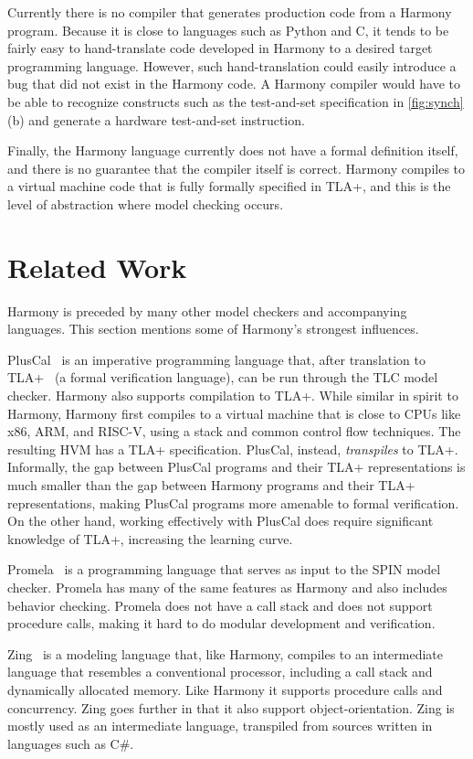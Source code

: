 \documentclass[twocolumn]{article}
\begin{document}
Currently there is no compiler that generates production code from
a Harmony program.
Because it is close to languages such as Python and C, it tends to be fairly
easy to hand-translate code developed in Harmony to a desired target
programming language.  However, such hand-translation could easily
introduce a bug that did not exist in the Harmony code.
A Harmony compiler would have to be able to recognize constructs such as
the test-and-set specification in \autoref{fig:synch}(b) and generate
a hardware test-and-set instruction.

Finally, the Harmony language currently does not have a formal definition
itself, and there is no guarantee that the compiler itself is correct.
Harmony compiles to a virtual machine code that is fully formally
specified in TLA+, and this is the level of abstraction where model
checking occurs.

\section{Related Work}

Harmony is preceded by many other model checkers and accompanying
languages.  This section mentions some of Harmony's strongest influences.

PlusCal~\cite{Lamport09} is an imperative programming language that,
after translation to TLA+~\cite{Lamport02} (a formal verification
language), can be run through the TLC model checker.  Harmony also
supports compilation to TLA+.  While similar in spirit to Harmony,
Harmony first compiles to a virtual machine that is close to CPUs
like x86, ARM, and RISC-V, using a stack and common control flow
techniques.  The resulting HVM has a TLA+ specification.  PlusCal,
instead, \emph{trans\-piles} to TLA+.  Informally, the gap between
PlusCal programs and their TLA+ representations is much smaller
than the gap between Harmony programs and their TLA+ representations,
making PlusCal programs more amenable to formal verification.  On the other
hand, working effectively with PlusCal does require significant
knowledge of TLA+, increasing the learning curve.

Promela~\cite{SPIN} is a programming language that serves as input
to the SPIN model checker.  Promela has many of the same features
as Harmony and also includes behavior checking.  Promela
does not have a call stack and does not support procedure calls,
making it hard to do modular development and verification.

Zing~\cite{Zing} is a modeling language that, like Harmony, compiles to an
intermediate language that resembles a conventional processor,
including a call stack and dynamically allocated memory.  Like
Harmony it supports procedure calls and concurrency.  Zing goes
further in that it also support object-orientation.  Zing is
mostly used as an intermediate language, transpiled from sources
written in languages such as C\#.
\end{document}
